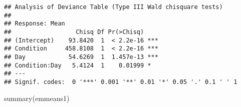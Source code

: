 \documentclass[
]{article}
\newenvironment{Shaded}{\begin{snugshade}}{\end{snugshade}}
\newcommand{\AttributeTok}[1]{\textcolor[rgb]{0.77,0.63,0.00}{#1}}
\newcommand{\DecValTok}[1]{\textcolor[rgb]{0.00,0.00,0.81}{#1}}
\newcommand{\DocumentationTok}[1]{\textcolor[rgb]{0.56,0.35,0.01}{\textbf{\textit{#1}}}}
\newcommand{\FunctionTok}[1]{\textcolor[rgb]{0.00,0.00,0.00}{#1}}
\newcommand{\NormalTok}[1]{#1}
\newcommand{\OtherTok}[1]{\textcolor[rgb]{0.56,0.35,0.01}{#1}}
\newcommand{\SpecialCharTok}[1]{\textcolor[rgb]{0.00,0.00,0.00}{#1}}
\newcommand{\StringTok}[1]{\textcolor[rgb]{0.31,0.60,0.02}{#1}}
\begin{document}
\begin{Shaded}
\end{Shaded}

\begin{verbatim}
## Analysis of Deviance Table (Type III Wald chisquare tests)
## 
## Response: Mean
##                  Chisq Df Pr(>Chisq)    
## (Intercept)    93.8420  1  < 2.2e-16 ***
## Condition     458.8108  1  < 2.2e-16 ***
## Day            54.6269  1  1.457e-13 ***
## Condition:Day   5.4124  1    0.01999 *  
## ---
## Signif. codes:  0 '***' 0.001 '**' 0.01 '*' 0.05 '.' 0.1 ' ' 1
\end{verbatim}

\begin{Shaded}
\begin{Highlighting}[]
\FunctionTok{summary}\NormalTok{(emmeans1)}
\end{Highlighting}
\end{Shaded}
\end{document}
